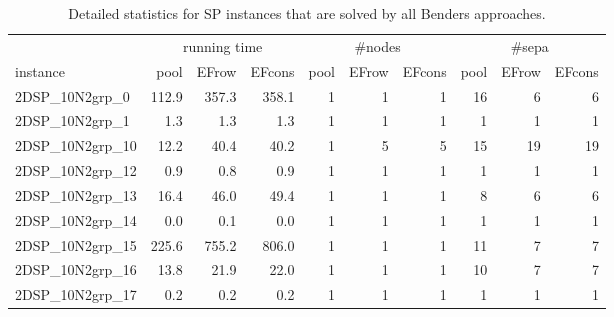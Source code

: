 \documentclass[a4paper,10pt]{article}
\newcommand{\spherepack}{SP\xspace}
\theoremstyle{definition}
\begin{document}
\begin{table}[t]
  \caption{Detailed statistics for \spherepack instances that are solved by all Benders approaches.}
  \label{tab:fulloptsp}
  \centering
  \begin{scriptsize}
  \begin{tabular*}{\textwidth}{@{}l@{\;\;\extracolsep{\fill}}rrrrrrrrr@{}}
    \toprule
    & \multicolumn{3}{c}{running time} & \multicolumn{3}{c}{\#nodes} & \multicolumn{3}{c}{\#sepa}\\
    \cmidrule{2-4} \cmidrule{5-7} \cmidrule{8-10}
    instance & pool & EFrow & EFcons & pool & EFrow & EFcons & pool & EFrow & EFcons \\
    \midrule
  2DSP\_10N2grp\_0 & \num{ 112.9} & \num{ 357.3} & \num{ 358.1} & \num{         1} & \num{         1} & \num{         1} & \num{        16} & \num{         6} & \num{         6}\\
  2DSP\_10N2grp\_1 & \num{   1.3} & \num{   1.3} & \num{   1.3} & \num{         1} & \num{         1} & \num{         1} & \num{         1} & \num{         1} & \num{         1}\\
 2DSP\_10N2grp\_10 & \num{  12.2} & \num{  40.4} & \num{  40.2} & \num{         1} & \num{         5} & \num{         5} & \num{        15} & \num{        19} & \num{        19}\\
 2DSP\_10N2grp\_12 & \num{   0.9} & \num{   0.8} & \num{   0.9} & \num{         1} & \num{         1} & \num{         1} & \num{         1} & \num{         1} & \num{         1}\\
 2DSP\_10N2grp\_13 & \num{  16.4} & \num{  46.0} & \num{  49.4} & \num{         1} & \num{         1} & \num{         1} & \num{         8} & \num{         6} & \num{         6}\\
 2DSP\_10N2grp\_14 & \num{   0.0} & \num{   0.1} & \num{   0.0} & \num{         1} & \num{         1} & \num{         1} & \num{         1} & \num{         1} & \num{         1}\\
 2DSP\_10N2grp\_15 & \num{ 225.6} & \num{ 755.2} & \num{ 806.0} & \num{         1} & \num{         1} & \num{         1} & \num{        11} & \num{         7} & \num{         7}\\
 2DSP\_10N2grp\_16 & \num{  13.8} & \num{  21.9} & \num{  22.0} & \num{         1} & \num{         1} & \num{         1} & \num{        10} & \num{         7} & \num{         7}\\
 2DSP\_10N2grp\_17 & \num{   0.2} & \num{   0.2} & \num{   0.2} & \num{         1} & \num{         1} & \num{         1} & \num{         1} & \num{         1} & \num{         1}\\

\end{tabular*}
\end{scriptsize}
\end{table}
\end{document}
